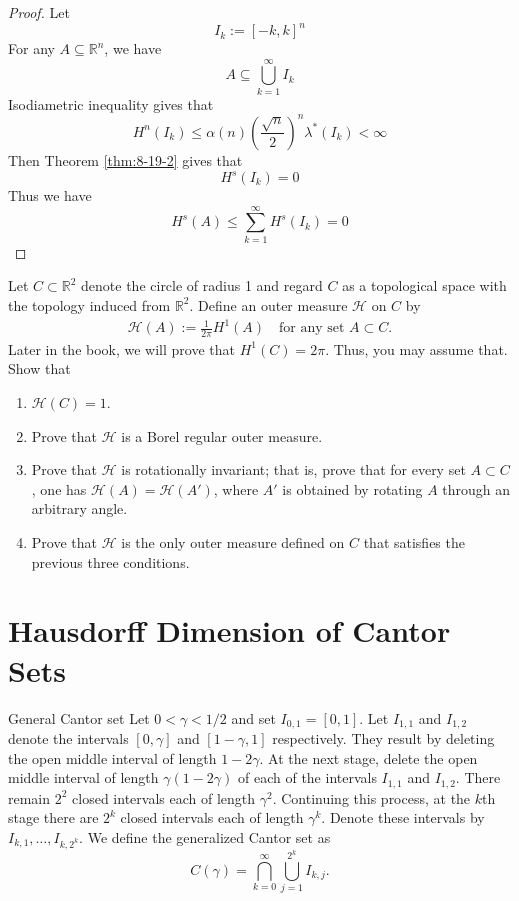 \documentclass[../main.tex]{subfiles}
\begin{document}
\begin{proof}
    Let \[
    I_{k}:= [-k ,k]^{n}
    \] For any \(  A\subseteq \mathbb{R} ^{n}  \), we have \[
    A\subseteq \bigcup _{k= 1}^{\infty}I_{k}
    \]Isodiametric inequality gives that \[
     H^{n}\left( I_{k} \right)\le \alpha \left( n \right)\left( \frac{\sqrt{n} }{2 }  \right)^{n} \lambda   ^{*}\left( I_{k} \right)< \infty  
    \]Then Theorem \ref{thm:8-19-2} gives that  \[
    H^{s}\left( I_{k} \right)= 0 
    \]Thus we have \[
   H^{s}\left( A \right)\le  \sum _{k= 1}^{\infty} H^{s}\left( I_{k} \right)  = 0
    \]   
\end{proof}

\begin{exercise}{}{}
    Let $C \subset \mathbb{R}^2$ denote the circle of radius 1 and regard $C$ as a topological space with the topology induced from $\mathbb{R}^2$. Define an outer measure $\mathcal{H}$ on $C$ by
\[\begin{aligned}
\mathcal{H}(A) := \frac{1}{2\pi} H^1(A) \quad \text{for any set } A \subset C.
\end{aligned}\]
Later in the book, we will prove that $H^1(C) = 2\pi$. Thus, you may assume that. Show that
\begin{enumerate}
\item[(i)] $\mathcal{H}(C) = 1$.
\item[(ii)] Prove that $\mathcal{H}$ is a Borel regular outer measure.
\item[(iii)] Prove that $\mathcal{H}$ is rotationally invariant; that is, prove that for every set $A \subset C$, one has $\mathcal{H}(A) = \mathcal{H}(A')$, where $A'$ is obtained by rotating $A$ through an arbitrary angle.
\item[(iv)] Prove that $\mathcal{H}$ is the only outer measure defined on $C$ that satisfies the previous three conditions.
\end{enumerate}
\end{exercise}

\section{Hausdorff Dimension of Cantor Sets}

\begin{definition}{General Cantor set}{}
Let $0 < \gamma < 1/2$ and set $I_{0,1} = [0, 1]$. Let $I_{1,1}$ and $I_{1,2}$ denote the intervals $[0, \gamma]$ and $[1 - \gamma, 1]$ respectively. They result by deleting the open middle interval of length $1 - 2\gamma$. At the next stage, delete the open middle interval of length $\gamma(1 - 2\gamma)$ of each of the intervals $I_{1,1}$ and $I_{1,2}$. There remain $2^2$ closed intervals each of length $\gamma^2$. Continuing this process, at the $k$th stage there are $2^k$ closed intervals each of length $\gamma^k$. Denote these intervals by $I_{k,1}, \dots, I_{k,2^k}$. We define the generalized Cantor set as
\[
C(\gamma) = \bigcap_{k=0}^{\infty} \bigcup_{j=1}^{2^k} I_{k,j}.
\]
\end{definition}
\end{document}
